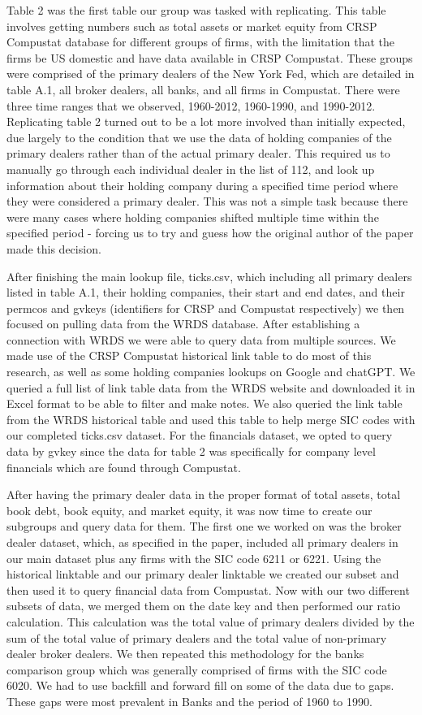 \documentclass{article}
\begin{document}
Table 2 was the first table our group was tasked with replicating. This table involves getting numbers such as total assets or market equity from CRSP Compustat database for different groups of firms, with the limitation that the firms be US domestic and have data available in CRSP Compustat. These groups were comprised of the primary dealers of the New York Fed, which are detailed in table A.1, all broker dealers, all banks, and all firms in Compustat. There were three time ranges that we observed, 1960-2012, 1960-1990, and 1990-2012. Replicating table 2 turned out to be a lot more involved than initially expected, due largely to the condition that we use the data of holding companies of the primary dealers rather than of the actual primary dealer. This required us to manually go through each individual dealer in the list of 112, and look up information about their holding company during a specified time period where they were considered a primary dealer. This was not a simple task because there were many cases where holding companies shifted multiple time within the specified period - forcing us to try and guess how the original author of the paper made this decision.

After finishing the main lookup file, ticks.csv, which including all primary dealers listed in table A.1, their holding companies, their start and end dates, and their permcos and gvkeys (identifiers for CRSP and Compustat respectively) we then focused on pulling data from the WRDS database. After establishing a connection with WRDS we were able to query data from multiple sources. We made use of the CRSP Compustat historical link table to do most of this research, as well as some holding companies lookups on Google and chatGPT. We queried a full list of link table data from the WRDS website and downloaded it in Excel format to be able to filter and make notes. We also queried the link table from the WRDS historical table and used this table to help merge SIC codes with our completed ticks.csv dataset. For the financials dataset, we opted to query data by gvkey since the data for table 2 was specifically for company level financials which are found through Compustat.

After having the primary dealer data in the proper format of total assets, total book debt, book equity, and market equity, it was now time to create our subgroups and query data for them. The first one we worked on was the broker dealer dataset, which, as specified in the paper, included all primary dealers in our main dataset plus any firms with the SIC code 6211 or 6221. Using the historical linktable and our primary dealer linktable we created our subset and then used it to query financial data from Compustat. Now with our two different subsets of data, we merged them on the date key and then performed our ratio calculation. This calculation was the total value of primary dealers divided by the sum of the total value of primary dealers and the total value of non-primary dealer broker dealers. We then repeated this methodology for the banks comparison group which was generally comprised of firms with the SIC code 6020. We had to use backfill and forward fill on some of the data due to gaps. These gaps were most prevalent in Banks and the period of 1960 to 1990.
\clearpage
\end{document}
